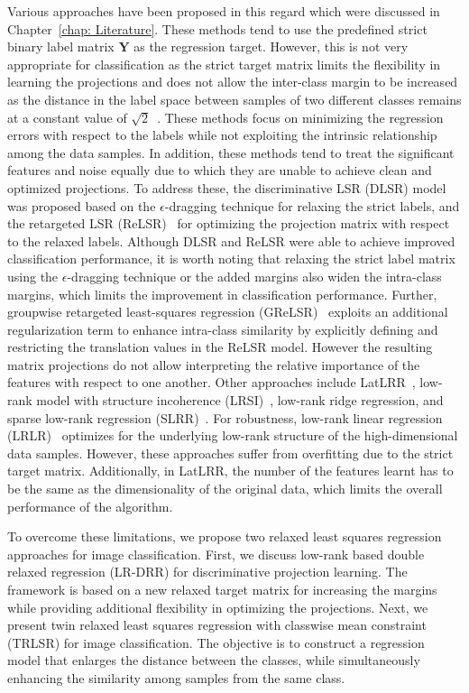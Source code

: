 Various approaches have been proposed in this regard which were discussed in Chapter~\ref{chap: Literature}. These methods tend to use the predefined strict binary label matrix $\mathbf{Y}$ as the regression target. However, this is not very appropriate for classification as the strict target matrix limits the flexibility in learning the projections and does not allow the inter-class margin to be increased as the distance in the label space between samples of two different classes remains at a constant value of $\sqrt{2}$~\cite{LCKSVD,DLSR,ReLSR}. These methods focus on minimizing the regression errors with respect to the labels while not exploiting the intrinsic relationship among the data samples. In addition, these methods tend to treat the significant features and noise equally due to which they are unable to achieve clean and optimized projections. To address these, the discriminative LSR (DLSR) model~\cite{DLSR} was proposed based on the $\epsilon$-dragging technique for relaxing the strict labels, and the retargeted LSR (ReLSR)~\cite{ReLSR} for optimizing the projection matrix with respect to the relaxed labels. Although DLSR and ReLSR were able to achieve improved classification performance, it is worth noting that relaxing the strict label matrix using the $\epsilon$-dragging technique or the added margins also widen the intra-class margins, which limits the improvement in classification performance. Further, groupwise retargeted least-squares regression (GReLSR)~\cite{GReLSR} exploits an additional regularization term to enhance intra-class similarity by explicitly defining and restricting the translation values in the ReLSR model. However the resulting matrix projections do not allow interpreting the relative importance of the features with respect to one another. Other approaches include LatLRR~\cite{LatLRR}, low-rank model with structure incoherence (LRSI)~\cite{LRSI}, low-rank ridge regression, and sparse low-rank regression (SLRR)~\cite{LRLR_SLRR}. For robustness, low-rank linear regression (LRLR)~\cite{LRLR_SLRR} optimizes for the underlying low-rank structure of the high-dimensional data samples. However, these approaches suffer from overfitting due to the strict target matrix. Additionally, in LatLRR, the number of the features learnt has to be the same as the dimensionality of the original data, which limits the overall performance of the algorithm.

To overcome these limitations, we propose two relaxed least squares regression approaches for image classification. First, we discuss low-rank based double relaxed regression (LR-DRR) for discriminative projection learning. The framework is based on a new relaxed target matrix for increasing the margins while providing additional flexibility in optimizing the projections. Next, we present twin relaxed least squares regression with classwise mean constraint (TRLSR) for image classification. The objective is to construct a regression model that enlarges the distance between the classes, while simultaneously enhancing the similarity among samples from the same class.
%

